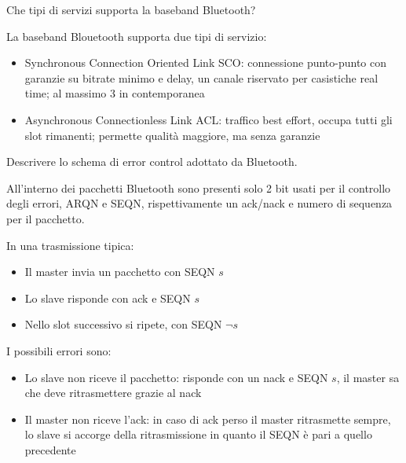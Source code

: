 \begin{questions}
    \question Che tipi di servizi supporta la baseband Bluetooth?
    
    \begin{solution}
        La baseband Blouetooth supporta due tipi di servizio: 
        \begin{itemize}
            \item Synchronous Connection Oriented Link SCO: connessione punto-punto con garanzie su bitrate minimo e delay, un canale riservato per casistiche real time; al massimo 3 in contemporanea
            
            \item Asynchronous Connectionless Link ACL: traffico best effort, occupa tutti gli slot rimanenti; permette qualità maggiore, ma senza garanzie
        \end{itemize}
    \end{solution}
    
    \question Descrivere lo schema di error control adottato da Bluetooth.
    
    \begin{solution}
        All'interno dei pacchetti Bluetooth sono presenti solo 2 bit usati per il controllo degli errori, ARQN e SEQN, rispettivamente un ack/nack e numero di sequenza per il pacchetto.
        
        In una trasmissione tipica: 
        \begin{itemize}
            \item Il master invia un pacchetto con SEQN $s$
            
            \item Lo slave risponde con ack e SEQN $s$
            
            \item Nello slot successivo si ripete, con SEQN $\neg s$
        \end{itemize}
        
        I possibili errori sono:
        \begin{itemize}
            \item Lo slave non riceve il pacchetto: risponde con un nack e SEQN $s$, il master sa che deve ritrasmettere grazie al nack
            
            \item Il master non riceve l'ack: in caso di ack perso il master ritrasmette sempre, lo slave si accorge della ritrasmissione in quanto il SEQN è pari a quello precedente
        \end{itemize}
    \end{solution}
\end{questions}